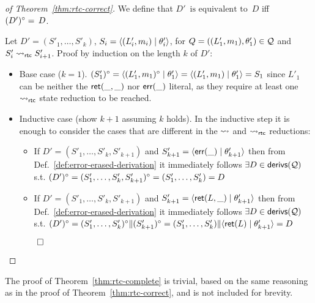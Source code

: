 \documentclass{llncs}
\begin{document}
\begin{proof}[of Theorem~\ref{thm:rtc-correct}]

  We define that $D'\, \text{~is equivalent to~} \,D$ iff
  $(D')^{\circ} = \,D$.

  Let $D'  = (S'_1,\ldots,S'_k)$,
      $S_i = \langle (L'_i,m_i) \mid{} \theta'_i \rangle$,
      for %
      $Q   = ((L'_1,m_1),\theta'_1) \in {\cal Q}$
      and $S'_i \leadsto_{\mathsf{rtc}} S'_{i+1}$.
  Proof by induction on the length $k$ of $D'$:
  \begin{itemize}
  \item Base case ($k=1$). %
    $(S'_1)^{\circ}
      = \langle (L'_1,m_1)^{\circ} \mid{} \theta'_1 \rangle
      = \langle (L'_1,m_1) \mid{} \theta'_1 \rangle
      = S_1$
    since $L'_1$ can be neither the $\textsf{ret}(\_,\_)$ nor $\textsf{err}(\_)$ literal,
    as they require at least one $ \leadsto_{\mathsf{rtc}} $ state reduction to
    be reached.
  \item Inductive case (show $k+1$ assuming $k$ holds). %
    In the inductive step it is enough to consider the cases that are
    different in the $ \leadsto $ and $ \leadsto_{\mathsf{rtc}} $
    reductions:
    \begin{itemize}
    \item If $D' = (S'_1,\ldots,S'_k,S'_{k+1})$ and
      $S'_{k+1} = \langle \textsf{err}(\_) \mid{} \theta'_{k+1} \rangle$ then from
      Def.~\ref{def:error-erased-derivation} it immediately follows
      $\exists D \in \textsf{derivs}({\cal Q})$ s.t.
      $(D')^{\circ}
        = (S'_1,\ldots,S'_k,S'_{k+1})^{\circ}
        = (S'_1,\ldots,S'_k)
        = D $
    \item If $D' = (S'_1,\ldots,S'_k,S'_{k+1})$ and
      $S'_{k+1} = \langle \textsf{ret}(L,\_) \mid{} \theta'_{k+1} \rangle$ then from
      Def.~\ref{def:error-erased-derivation} it immediately follows
      $\exists D \in \textsf{derivs}({\cal Q})$ s.t.
      $(D')^{\circ}
        = (S'_1,\ldots,S'_k)^{\circ} \Vert (S'_{k+1})^{\circ}
        = (S'_1,\ldots,S'_k) \Vert \langle \textsf{ret}(L) \mid{} \theta'_{k+1} \rangle
        = D$
    \end{itemize}
    \hfill $\qed$
  \end{itemize}
\end{proof}

The proof of Theorem~\ref{thm:rtc-complete} is trivial, based on the
  same reasoning as in the proof of Theorem~\ref{thm:rtc-correct}, and
  is not included for brevity.
\end{document}
